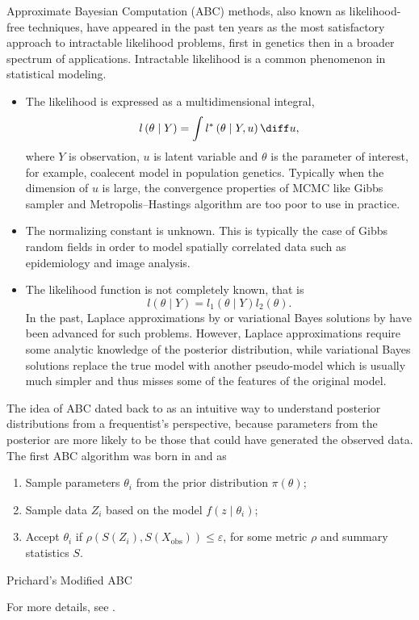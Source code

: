 Approximate Bayesian Computation (ABC) methods, also known as likelihood-free
techniques, have appeared in the past ten years as the most satisfactory
approach to intractable likelihood problems, first in genetics then
in a broader spectrum of applications. Intractable likelihood is a
common phenomenon in statistical modeling. 
\begin{itemize}
\item The likelihood is expressed as a multidimensional integral, 
\[
l\left(\theta\mid Y\right)=\int l^{*}\left(\theta\mid Y,u\right)\diff u,
\]
where $Y$ is observation, $u$ is latent variable and $\theta$ is
the parameter of interest, for example, coalecent model in population
genetics. Typically when the dimension of $u$ is large, the convergence
properties of MCMC like Gibbs sampler and Metropolis--Hastings algorithm
are too poor to use in practice. 
\item The normalizing constant is unknown. This is typically the case of
Gibbs random fields in order to model spatially correlated data such
as epidemiology and image analysis. 
\item The likelihood function is not completely known, that is 
\[
l\left(\theta\mid Y\right)=l_{1}\left(\theta\mid Y\right)l_{2}\left(\theta\right).
\]
In the past, Laplace approximations by \citet{tierney1986accurate}
or variational Bayes solutions by \citet{jaakkola2000bayesian} have
been advanced for such problems. However, Laplace approximations require
some analytic knowledge of the posterior distribution, while variational
Bayes solutions replace the true model with another pseudo-model which
is usually much simpler and thus misses some of the features of the
original model.
\end{itemize}
\begin{comment}
abc machine learning
\end{comment}


The idea of ABC dated back to \citet{rubin1984bayesianly} as an intuitive
way to understand posterior distributions from a frequentist's perspective,
because parameters from the posterior are more likely to be those
that could have generated the observed data. The first ABC algorithm
was born in \citet{tavare1997inferring} and  \citet{pritchard1999population}
as 
\begin{algorithm}[h]
\begin{enumerate}
\item Sample parameters $\theta_{i}$ from the prior distribution $\pi\left(\theta\right)$;
\item Sample data $Z_{i}$ based on the model $f\left(z\mid\theta_{i}\right)$;
\item Accept $\theta_{i}$ if $\rho\left(S\left(Z_{i}\right),S\left(X_{\mathrm{obs}}\right)\right)\le\varepsilon$, {{}
} {for some metric $\rho$ and summary statistics
$S$. }
\end{enumerate}
\protect\caption{\label{alg:Prichard-ABC}Prichard's Modified ABC}
\end{algorithm}
For more details, see \citet{marin2012approximate}.


